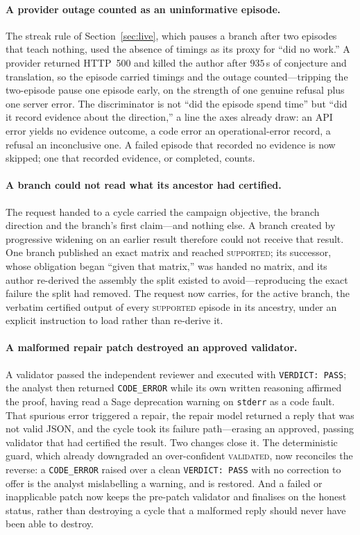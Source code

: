 \documentclass[11pt,a4paper]{article}
\newcommand{\code}[1]{\texttt{\small #1}}
\begin{document}
\paragraph{A provider outage counted as an uninformative episode.} The streak
rule of Section~\ref{sec:live}, which pauses a branch after two episodes that
teach nothing, used the absence of timings as its proxy for ``did no work.'' A
provider returned HTTP~500 and killed the author after $935$\,s of conjecture and
translation, so the episode carried timings and the outage counted---tripping the
two-episode pause one episode early, on the strength of one genuine refusal plus
one server error. The discriminator is not ``did the episode spend time'' but
``did it record evidence about the direction,'' a line the axes already draw: an
API error yields no evidence outcome, a code error an operational-error record, a
refusal an inconclusive one. A failed episode that recorded no evidence is now
skipped; one that recorded evidence, or completed, counts.

\paragraph{A branch could not read what its ancestor had certified.} The request
handed to a cycle carried the campaign objective, the branch direction and the
branch's first claim---and nothing else. A branch created by progressive widening
on an earlier result therefore could not receive that result. One branch
published an exact matrix and reached \textsc{supported}; its successor, whose
obligation began ``given that matrix,'' was handed no matrix, and its author
re-derived the assembly the split existed to avoid---reproducing the exact
failure the split had removed. The request now carries, for the active branch,
the verbatim certified output of every \textsc{supported} episode in its
ancestry, under an explicit instruction to load rather than re-derive it.

\paragraph{A malformed repair patch destroyed an approved validator.} A validator
passed the independent reviewer and executed with \code{VERDICT: PASS}; the
analyst then returned \code{CODE\_ERROR} while its own written reasoning affirmed
the proof, having read a Sage deprecation warning on \code{stderr} as a code
fault. That spurious error triggered a repair, the repair model returned a reply
that was not valid JSON, and the cycle took its failure path---erasing an
approved, passing validator that had certified the result. Two changes close it.
The deterministic guard, which already downgraded an over-confident
\textsc{validated}, now reconciles the reverse: a \code{CODE\_ERROR} raised over a
clean \code{VERDICT: PASS} with no correction to offer is the analyst mislabelling
a warning, and is restored. And a failed or inapplicable patch now keeps the
pre-patch validator and finalises on the honest status, rather than destroying a
cycle that a malformed reply should never have been able to destroy.
\end{document}

